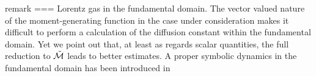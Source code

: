 remark === {Lorentz gas in the fundamental domain.}{
The vector valued nature of the moment-generating function  in
the case under consideration makes it difficult to perform a calculation of
the diffusion constant within the fundamental domain.
Yet we point out that, at least as regards scalar quantities, the
full reduction to $\tilde{{\cal M}}$ leads to better estimates.
A proper symbolic dynamics in the fundamental domain has been
introduced in %
\PublicPrivate{.}{%
, numerical estimates for scalar
quantities are reported in \reftab{t-diff-5a}, taken from \refref{CGS}.
      }%
%
}
